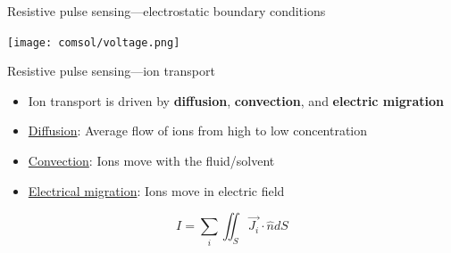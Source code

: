 \begin{frame}[c]{Resistive pulse sensing---electrostatic boundary conditions}
	{\centering
		\texttt{[image: comsol/voltage.png]}
		\par
	}
\end{frame}






\begin{frame}[c]{Resistive pulse sensing---ion transport}
	\begin{itemize}
		\item Ion transport is driven by \textbf{diffusion}, \textbf{convection}, and \textbf{electric migration}
		\item \underline{Diffusion}: Average flow of ions from high to low concentration
		\item \underline{Convection}: Ions move with the fluid/solvent
		\item \underline{Electrical migration}: Ions move in electric field
	\end{itemize}
	
	$$ I=\sum_{i}\iint_{S}\vec{J_{i}}\cdot \hat{n}dS $$
	

\end{frame}






